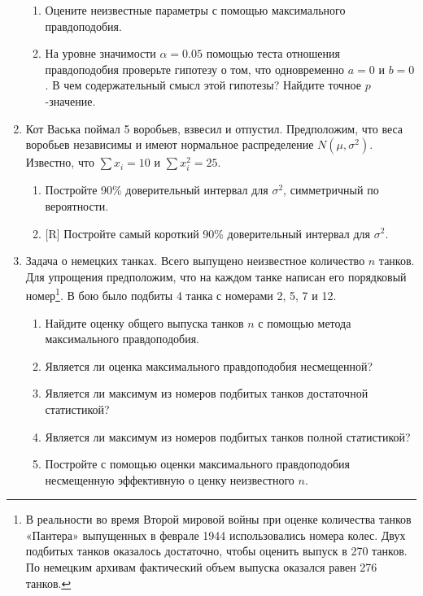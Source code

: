 \begin{enumerate}
\begin{enumerate}
\item Оцените неизвестные параметры с помощью максимального правдоподобия.
\item На уровне значимости $\alpha=0.05$ помощью теста отношения правдоподобия
проверьте гипотезу о том, что одновременно $a=0$ и $b=0$. В чем содержательный
смысл этой гипотезы? Найдите точное $p$-значение.
\end{enumerate}


\item Кот Васька поймал 5 воробьев, взвесил и отпустил. Предположим, что веса
воробьев независимы и имеют нормальное распределение $N(\mu,\sigma^2)$. Известно,
что $\sum x_i=10$ и $\sum x_i^2=25$.
\begin{enumerate}
\item Постройте 90\% доверительный интервал для $\sigma^2$, симметричный по вероятности.
\item $[$R]  Постройте самый короткий 90\% доверительный интервал для $\sigma^2$.
\end{enumerate}

\item Задача о немецких танках. Всего выпущено неизвестное количество $n$ танков.
Для упрощения предположим, что на каждом танке написан его порядковый номер\footnote{В
реальности во время Второй мировой войны при оценке количества танков «Пантера»
выпущенных в феврале 1944 использовались номера колес. Двух подбитых танков оказалось
достаточно, чтобы оценить выпуск в 270 танков. По немецким архивам фактический объем
выпуска оказался равен 276 танков. }. В бою было подбиты 4 танка с номерами 2, 5, 7 и 12.
\begin{enumerate}
\item Найдите оценку общего выпуска танков $n$ с помощью метода максимального правдоподобия.
\item Является ли оценка максимального правдоподобия несмещенной?
\item Является ли максимум из номеров подбитых танков достаточной статистикой?
\item Является ли максимум из номеров подбитых танков полной статистикой?
\item Постройте с помощью оценки максимального правдоподобия несмещенную эффективную о
ценку неизвестного $n$.
\end{enumerate}


\end{enumerate}
